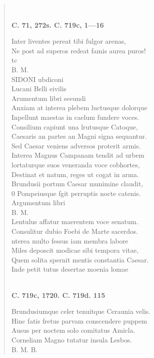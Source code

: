 \documentclass[11pt, a4paper]{report}
\begin{document}
\begin{verse}
        ﻿\pagebreak 
     \marginpar{[195]} \begin{center} \textbf{C. 71, 272s. C. 719c, 1—16} \end{center}Inter liventes pereat tibi fulgor arenas, \\ Ne post ad superos redeat famis aurea puros! \\ tc \\ B. M. \\ SIDONI ubdiconi \\  \lbrack Lucani Belli eivilis \rbrack  \\ Arumentum libri seeundi \\ Anxiam  \lbrack at \rbrack  interea plebem luctusque dolorque \\ Inpellunt maestas in caelum fundere voces. \\ Consilium capiunt una lrutusque Catoque, \\ Caesaris an partes an Magni signa sequantur. \\ Sed Caesar veniens adversos proterit armis. \\ Interea Magnus Campanam tendit ad urbem \\ lortaturque suos veneranda voce cobhortes, \\ Destinat et natum, reges ut cogat in arma. \\ Brundusii portum Caesar munimine claudit, \\ 0 Pompeiusque fgit perruptis nocte catenis. \\ Argumentum libri \\ B. M. \\ Lentulus affatur maerentem voce senatum. \\ Consulitur dubio Foebi de Marte sacerdos. \\ nterea multo fessus iam membra labore \\ Miles deposcit modicae sibi tempora vitae, \\ Quem solita spernit mentis constantia Caesar. \\ Inde petit tutus desertae moenia lomae \\ 
        ﻿\pagebreak 
    \begin{center} \textbf{C. 719c, 1720. C. 719d. 115} \end{center} \marginpar{[196]} Brundusiumque celer tenuitque Ceraunia velis. \\ Hinc fatis fretus parvam conscendere puppem \\ Ausus per noctem solo comitatus Amicla. \\ Corneliam Magno tutatur insula Lesbos. \\ B. M. B. \\ 
      \end{verse}
  
\end{document}
